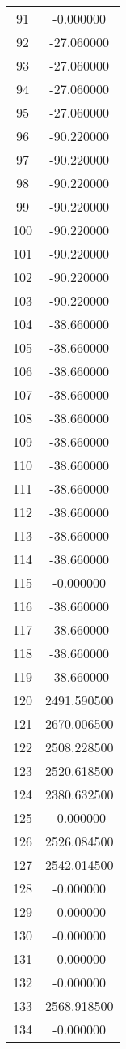 \documentclass[12pt]{article}
\begin{document}
\begin{longtable}{@{}cc@{}}
91 & -0.000000 \\
92 & -27.060000 \\
93 & -27.060000 \\
94 & -27.060000 \\
95 & -27.060000 \\
96 & -90.220000 \\
97 & -90.220000 \\
98 & -90.220000 \\
99 & -90.220000 \\
100 & -90.220000 \\
101 & -90.220000 \\
102 & -90.220000 \\
103 & -90.220000 \\
104 & -38.660000 \\
105 & -38.660000 \\
106 & -38.660000 \\
107 & -38.660000 \\
108 & -38.660000 \\
109 & -38.660000 \\
110 & -38.660000 \\
111 & -38.660000 \\
112 & -38.660000 \\
113 & -38.660000 \\
114 & -38.660000 \\
115 & -0.000000 \\
116 & -38.660000 \\
117 & -38.660000 \\
118 & -38.660000 \\
119 & -38.660000 \\
120 & 2491.590500 \\
121 & 2670.006500 \\
122 & 2508.228500 \\
123 & 2520.618500 \\
124 & 2380.632500 \\
125 & -0.000000 \\
126 & 2526.084500 \\
127 & 2542.014500 \\
128 & -0.000000 \\
129 & -0.000000 \\
130 & -0.000000 \\
131 & -0.000000 \\
132 & -0.000000 \\
133 & 2568.918500 \\
134 & -0.000000 \\

\end{longtable}
\end{document}

